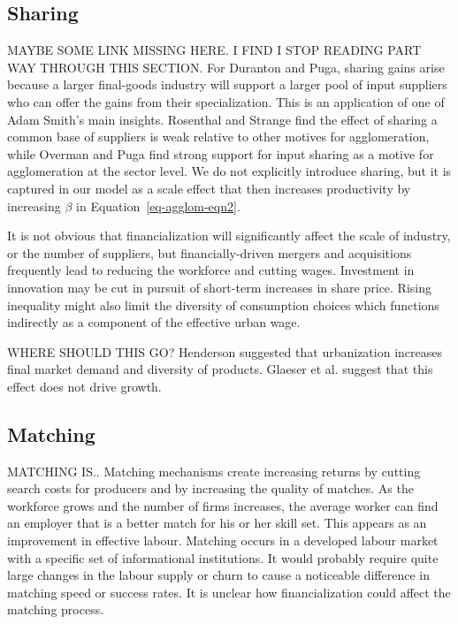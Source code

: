 \documentclass[a4paper]{article}
\theoremstyle{definition}
\theoremstyle{plain}
\begin{document}
{\color{red}

 
\subsection{Sharing}
MAYBE SOME LINK MISSING HERE. I FIND I STOP READING PART WAY THROUGH THIS SECTION.
For Duranton and Puga, sharing gains arise because a larger final-goods industry will support a larger pool of input suppliers who can offer the gains from their specialization. This is an application of one of Adam Smith's main insights. Rosenthal and Strange \cite{rosenthalEvidenceNatureSources2004} find the effect of sharing a common base of suppliers is weak relative to other motives for agglomeration, while  Overman and Puga \cite{overmanLaborPoolingSource2010} find strong support for input sharing as a motive for agglomeration at the sector level. We do not explicitly introduce sharing, but it is captured in our model as a scale effect that then increases productivity by increasing $\beta$ in Equation~\ref{eq-agglom-eqn2}. 

It is not obvious that financialization will significantly affect the scale of industry, or the number of suppliers, but financially-driven mergers and acquisitions frequently lead to reducing the workforce and cutting wages. Investment in innovation may be cut in pursuit of short-term increases in share price.  Rising inequality might also limit the diversity of consumption choices which functions indirectly as a component of the effective urban wage. 

WHERE SHOULD THIS GO? Henderson \cite{Henderson1972Sizes} suggested that urbanization increases final market demand and diversity of products. Glaeser et al. \cite{glaeserGrowthCities1991a} suggest that this effect does not drive growth. 
 
\subsection{Matching}
MATCHING IS.. 
Matching mechanisms create increasing returns by cutting search costs for producers and by increasing the quality of matches. As the workforce grows and the number of firms increases, the average worker can find an employer that is a better match for his or her skill set. This appears as an improvement in effective labour. Matching occurs in a developed labour market with a specific set of informational institutions. It would probably require quite large changes in the labour supply or churn to cause a noticeable difference in matching speed or success rates. It is unclear how financialization could affect the matching process.

}
\end{document}
